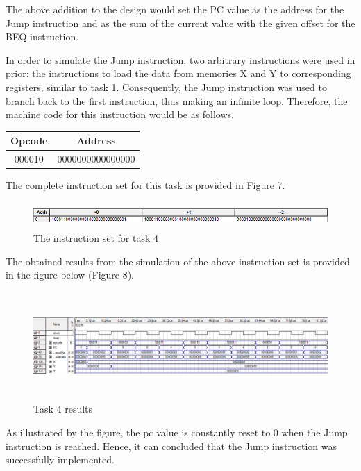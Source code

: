 \documentclass[12pt,a4paper]{article}
\begin{document}
	\noindent The above addition to the design would set the PC value as the address for the Jump instruction and as the sum of the current value with the given offset for the BEQ instruction.
	
	\noindent In order to simulate the Jump instruction, two arbitrary instructions were used in prior: the instructions to load the data from memories X and Y to corresponding registers, similar to task 1. Consequently, the Jump instruction was used to branch back to the first instruction, thus making an infinite loop. Therefore, the machine code for this instruction would be as follows. 
	
	\begin{table}[H]
		\centering
		\begin{tabular}{|c | c|}
			\hline
			\textbf{Opcode}& \textbf{Address}\\ \hline
			000010 & 0000000000000000\\\hline
		\end{tabular}
	\end{table}

	\noindent The complete instruction set for this task is provided in Figure 7.
	
	\begin{figure}[H]
		\centering
		\includegraphics[height=1cm,width=14cm]{figures/code4.png}
		\caption{The instruction set for task 4}
	\end{figure}
	
	\noindent The obtained results from the simulation of the above instruction set is provided in the figure below (Figure 8).
	
	\begin{figure}[H]
		\centering
		\includegraphics[height=4.1cm,width=15cm]{figures/simulations4.png}
		\caption{Task 4 results}
	\end{figure}

	\noindent As illustrated by the figure, the pc value is constantly reset to 0 when the Jump instruction is reached. Hence, it can concluded that the Jump instruction was successfully implemented.
	
\end{document}
